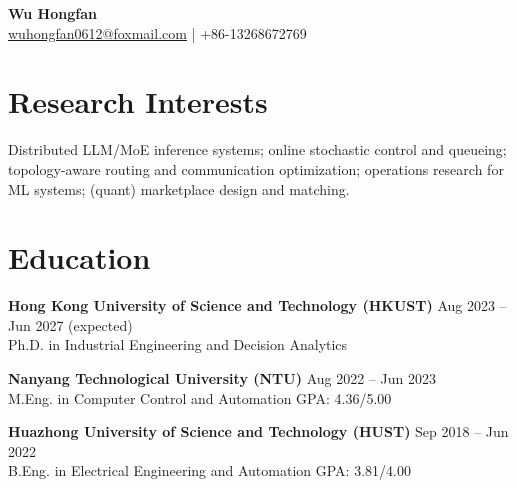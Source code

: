 \documentclass[11pt,a4paper]{article}
\newcommand{\cvname}[1]{{\LARGE\textbf{#1}}}
\newcommand{\cvsubheading}[2]{\textbf{#1} \hfill {#2}\\}
\newcommand{\cvsmall}{\fontsize{10.2pt}{12pt}\selectfont}
\begin{document}
\cvsmall

\cvname{Wu Hongfan}\\[2pt]
\href{mailto:wuhongfan0612@foxmail.com}{wuhongfan0612@foxmail.com} \;|\; +86-13268672769

\vspace{6pt}

\section*{Research Interests}
Distributed LLM/MoE inference systems; online stochastic control and queueing; topology-aware routing and communication optimization; operations research for ML systems; (quant) marketplace design and matching.

\section*{Education}
\cvsubheading{Hong Kong University of Science and Technology (HKUST)}{Aug 2023 -- Jun 2027 (expected)}
Ph.D. in Industrial Engineering and Decision Analytics

\cvsubheading{Nanyang Technological University (NTU)}{Aug 2022 -- Jun 2023}
M.Eng. in Computer Control and Automation \hfill GPA: 4.36/5.00

\cvsubheading{Huazhong University of Science and Technology (HUST)}{Sep 2018 -- Jun 2022}
B.Eng. in Electrical Engineering and Automation \hfill GPA: 3.81/4.00

\end{document}
